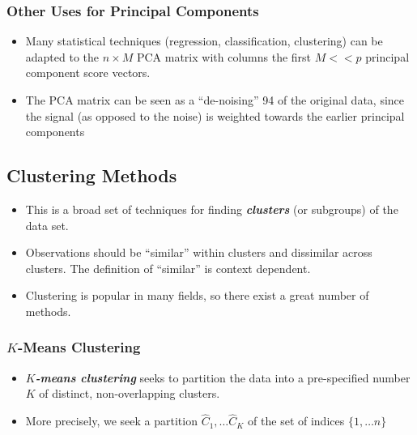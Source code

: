 \documentclass[11pt]{article}
\providecommand{\tightlist}{%
      \setlength{\itemsep}{0pt}\setlength{\parskip}{0pt}}
\begin{document}
    \hypertarget{other-uses-for-principal-components}{%
\subsubsection{Other Uses for Principal
Components}\label{other-uses-for-principal-components}}

    \begin{itemize}
\tightlist
\item
  Many statistical techniques (regression, classification, clustering)
  can be adapted to the \(n \times M\) PCA matrix with columns the first
  \(M << p\) principal component score vectors.
\item
  The PCA matrix can be seen as a ``de-noising'' 94 of the original
  data, since the signal (as opposed to the noise) is weighted towards
  the earlier principal components
\end{itemize}

    \hypertarget{clustering-methods}{%
\subsection{Clustering Methods}\label{clustering-methods}}

    \begin{itemize}
\tightlist
\item
  This is a broad set of techniques for finding \textbf{\emph{clusters}}
  (or subgroups) of the data set.
\item
  Observations should be ``similar'' within clusters and dissimilar
  across clusters. The definition of ``similar'' is context dependent.
\item
  Clustering is popular in many fields, so there exist a great number of
  methods.
\end{itemize}

    \hypertarget{k-means-clustering}{%
\subsubsection{\texorpdfstring{\(K\)-Means
Clustering}{K-Means Clustering}}\label{k-means-clustering}}

    \begin{itemize}
\tightlist
\item
  \textbf{\emph{\(K\)-means clustering}} seeks to partition the data
  into a pre-specified number \(K\) of distinct, non-overlapping
  clusters.
\item
  More precisely, we seek a partition \(\hat{C}_1, \dots \hat{C}_K\) of
  the set of indices \(\{1, \dots n\}\)
\end{itemize}
\end{document}
